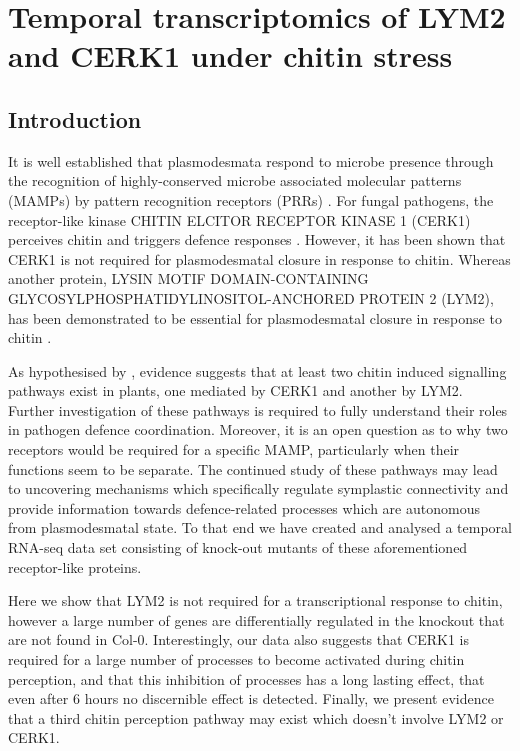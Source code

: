 \documentclass[../main.tex]{subfiles}
\begin{document}
\chapter{Temporal transcriptomics of LYM2 and CERK1 under chitin stress}
\label{cha:transcripts}

\section{Introduction}
It is well established that plasmodesmata respond to microbe presence
through the recognition of highly-conserved microbe associated
molecular patterns (MAMPs) by pattern recognition receptors (PRRs)
\cite{chevalPlasmodesmalRegulationPlant2018,
  zipfelPlantPatternrecognitionReceptors2014,
  lunaCalloseDepositionMultifaceted2010}. For fungal pathogens, the
receptor-like kinase CHITIN ELCITOR RECEPTOR KINASE 1 (CERK1)
perceives chitin and triggers defence responses
\cite{miyaCERK1LysMReceptor2007}. However, it has been shown that
CERK1 is not required for plasmodesmatal closure in response to
chitin. Whereas another protein, LYSIN MOTIF DOMAIN-CONTAINING
GLYCOSYLPHOSPHATIDYLINOSITOL-ANCHORED PROTEIN 2 (LYM2), has been
demonstrated to be essential for plasmodesmatal closure in response to chitin
\cite{Faulkner2013}.


As hypothesised by \citet{Faulkner2013}, evidence suggests that at least two chitin induced signalling pathways exist in plants, one mediated by CERK1 and another by LYM2. Further investigation of these pathways is required to fully understand their roles in pathogen defence coordination. Moreover, it is an open question as to why two receptors would be required for a specific MAMP, particularly when their functions seem to be separate. The continued study of these pathways may lead to uncovering mechanisms which specifically regulate symplastic connectivity and provide information towards defence-related processes which are autonomous from plasmodesmatal state. To that end we have created and analysed a temporal RNA-seq data set consisting of knock-out mutants of these aforementioned receptor-like proteins. 


Here we show that LYM2 is not required for a transcriptional response to chitin, however a large number of genes are differentially regulated in the knockout that are not found in Col-0. Interestingly, our data also suggests that CERK1 is required for a large number of processes to become activated during chitin perception, and that this inhibition of processes has a long lasting effect, that even after 6 hours no discernible effect is detected. Finally, we present evidence that a third chitin perception pathway may exist which doesn't involve LYM2 or CERK1.
\end{document}
